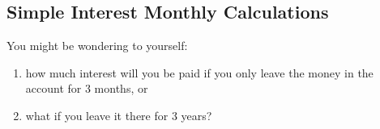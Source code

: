             \subsection{ Simple Interest Monthly Calculations}
            \nopagebreak
            
        
        \label{m39332*id69658}You might be wondering to yourself:\par 
        \label{m39332*id69662}\begin{enumerate}[noitemsep, label=\textbf{\arabic*}. ] 
            \label{m39332*uid30}\item how much interest will you be paid if you only leave the money in the account for 3 months, or
\label{m39332*uid31}\item what if you leave it there for 3 years?
\end{enumerate}
        
